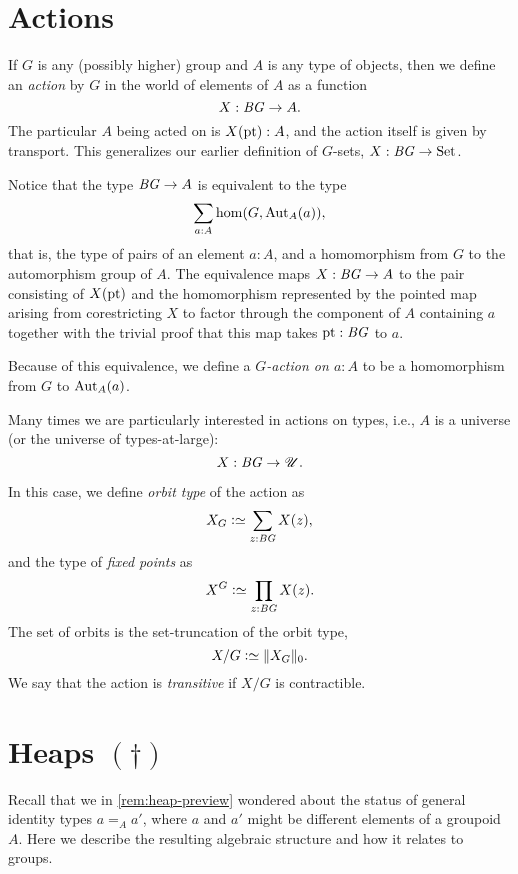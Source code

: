 \section{Actions}
\label{sec:actions}

If $G$ is any (possibly higher) group and $A$ is any type of objects,
then we define an \emph{action} by $G$ in the world of elements of $A$ as a function
\[
  X : \mathit{B}\mathit{G} \to A.
\]
The particular $A$ being acted on is $X(\mathrm{pt}):A$,
and the action itself is given by transport.
This generalizes our earlier definition of $G$-sets, $X : \mathit{B}\mathit{G} \to \mathrm{Set}$.

Notice that the type $\mathit{B}\mathit{G} \to A$ is equivalent to the type
\[
  \sum_{a:A}\hom(G,\Aut_A(a)),
\]
that is, the type of pairs of an element $a : A$,
and a homomorphism from $G$ to the automorphism group of $A$.
The equivalence maps $X:\mathit{B}\mathit{G}\to A$ to the pair consisting of $X(\mathrm{pt})$
and the homomorphism represented by the pointed map arising
from corestricting $X$ to factor through the component of $A$ containing $a$
together with the trivial proof that this map takes $\mathrm{pt}:\mathit{B}\mathit{G}$ to $a$.

Because of this equivalence,
we define a \emph{$G$-action on $a:A$}
to be a homomorphism from $G$ to $\Aut_A(a)$.

Many times we are particularly interested in actions on types,
i.e., $A$ is a universe (or the universe of types-at-large):
\[
  X : \mathit{B}\mathit{G} \to {\mathscr{U}}.
\]

In this case, we define \emph{orbit type} of the action as
\[
  X_G \defeq \sum_{z:\BG} X(z),
\]
and the type of \emph{fixed points} as
\[
  X^G \defeq \prod_{z:\BG} X(z).
\]
The set of orbits is the set-truncation of the orbit type,
\[
  X / G \defeq \Trunc{X_G}_0.
\]
We say that the action is \emph{transitive} if $X / G$ is contractible.

\section{Heaps \texorpdfstring{$(\dagger)$}{(\textdagger)}}
\label{sec:heaps}

Recall that we in \cref{rem:heap-preview} wondered about
the status of general identity types $a=_A a'$,
where $a$ and $a'$ might be different elements of a groupoid $A$.
Here we describe the resulting algebraic structure
and how it relates to groups.

